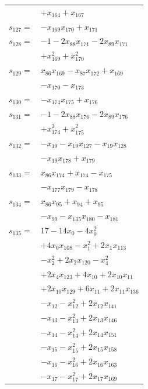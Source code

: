 \begin{longtable}{@{}r@{\;}l@{}}
 & \(\displaystyle +x_{164} +x_{167}\) \\[3pt]
\(s_{127}=\) & \(\displaystyle -x_{169}x_{170} +x_{171}\) \\[3pt]
\(s_{128}=\) & \(\displaystyle -1 -2x_{88}x_{171} -2x_{89}x_{171}\) \\
 & \(\displaystyle +x_{169}^{2} +x_{170}^{2}\) \\[3pt]
\(s_{129}=\) & \(\displaystyle x_{86}x_{169} -x_{87}x_{172} +x_{169}\) \\
 & \(\displaystyle -x_{170} -x_{173}\) \\[3pt]
\(s_{130}=\) & \(\displaystyle -x_{174}x_{175} +x_{176}\) \\[3pt]
\(s_{131}=\) & \(\displaystyle -1 -2x_{88}x_{176} -2x_{89}x_{176}\) \\
 & \(\displaystyle +x_{174}^{2} +x_{175}^{2}\) \\[3pt]
\(s_{132}=\) & \(\displaystyle -x_{19} -x_{19}x_{127} -x_{19}x_{128}\) \\
 & \(\displaystyle -x_{19}x_{178} +x_{179}\) \\[3pt]
\(s_{133}=\) & \(\displaystyle x_{86}x_{174} +x_{174} -x_{175}\) \\
 & \(\displaystyle -x_{177}x_{179} -x_{178}\) \\[3pt]
\(s_{134}=\) & \(\displaystyle x_{86}x_{95} +x_{94} +x_{95}\) \\
 & \(\displaystyle -x_{99} -x_{135}x_{180} -x_{181}\) \\[3pt]
\(s_{135}=\) & \(\displaystyle 17 -14x_{0} -4x_{0}^{2}\) \\
 & \(\displaystyle +4x_{0}x_{108} -x_{1}^{2} +2x_{1}x_{113}\) \\
 & \(\displaystyle -x_{2}^{2} +2x_{2}x_{120} -x_{4}^{2}\) \\
 & \(\displaystyle +2x_{4}x_{123} +4x_{10} +2x_{10}x_{11}\) \\
 & \(\displaystyle +2x_{10}x_{129} +6x_{11} +2x_{11}x_{136}\) \\
 & \(\displaystyle -x_{12} -x_{12}^{2} +2x_{12}x_{141}\) \\
 & \(\displaystyle -x_{13} -x_{13}^{2} +2x_{13}x_{146}\) \\
 & \(\displaystyle -x_{14} -x_{14}^{2} +2x_{14}x_{151}\) \\
 & \(\displaystyle -x_{15} -x_{15}^{2} +2x_{15}x_{158}\) \\
 & \(\displaystyle -x_{16} -x_{16}^{2} +2x_{16}x_{163}\) \\
 & \(\displaystyle -x_{17} -x_{17}^{2} +2x_{17}x_{169}\) \\

\end{longtable}
